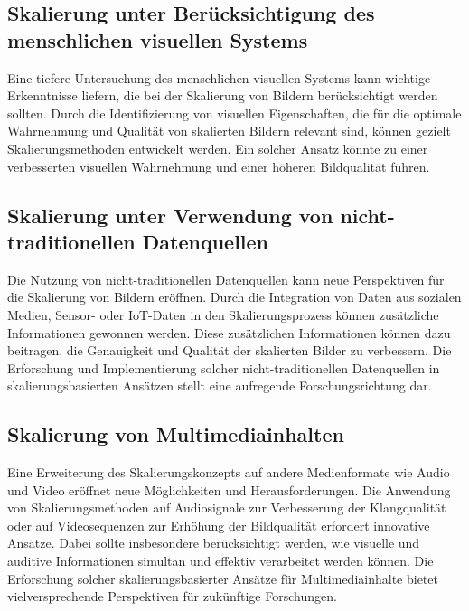\subsection{Skalierung unter Berücksichtigung des menschlichen visuellen Systems}
Eine tiefere Untersuchung des menschlichen visuellen Systems kann wichtige Erkenntnisse liefern, die bei der Skalierung von Bildern berücksichtigt werden sollten. Durch die Identifizierung von visuellen Eigenschaften, die für die optimale Wahrnehmung und Qualität von skalierten Bildern relevant sind, können gezielt Skalierungsmethoden entwickelt werden. Ein solcher Ansatz könnte zu einer verbesserten visuellen Wahrnehmung und einer höheren Bildqualität führen.

\subsection{Skalierung unter Verwendung von nicht-traditionellen Datenquellen}
Die Nutzung von nicht-traditionellen Datenquellen kann neue Perspektiven für die Skalierung von Bildern eröffnen. Durch die Integration von Daten aus sozialen Medien, Sensor- oder IoT-Daten in den Skalierungsprozess können zusätzliche Informationen gewonnen werden. Diese zusätzlichen Informationen können dazu beitragen, die Genauigkeit und Qualität der skalierten Bilder zu verbessern. Die Erforschung und Implementierung solcher nicht-traditionellen Datenquellen in skalierungsbasierten Ansätzen stellt eine aufregende Forschungsrichtung dar.

\subsection{Skalierung von Multimediainhalten}
Eine Erweiterung des Skalierungskonzepts auf andere Medienformate wie Audio und Video eröffnet neue Möglichkeiten und Herausforderungen. Die Anwendung von Skalierungsmethoden auf Audiosignale zur Verbesserung der Klangqualität oder auf Videosequenzen zur Erhöhung der Bildqualität erfordert innovative Ansätze. Dabei sollte insbesondere berücksichtigt werden, wie visuelle und auditive Informationen simultan und effektiv verarbeitet werden können. Die Erforschung solcher skalierungsbasierter Ansätze für Multimediainhalte bietet vielversprechende Perspektiven für zukünftige Forschungen.
